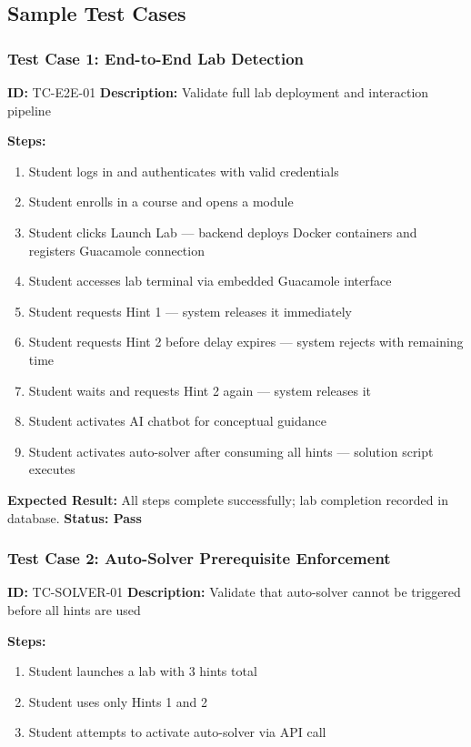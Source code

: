 \documentclass[12pt,a4paper]{report}
\begin{document}
\subsection{Sample Test Cases}

\subsubsection{Test Case 1: End-to-End Lab Detection}

\textbf{ID:} TC-E2E-01 \quad \textbf{Description:} Validate full lab deployment and interaction pipeline

\textbf{Steps:}
\begin{enumerate}
  \item Student logs in and authenticates with valid credentials
  \item Student enrolls in a course and opens a module
  \item Student clicks Launch Lab --- backend deploys Docker containers and registers Guacamole connection
  \item Student accesses lab terminal via embedded Guacamole interface
  \item Student requests Hint 1 --- system releases it immediately
  \item Student requests Hint 2 before delay expires --- system rejects with remaining time
  \item Student waits and requests Hint 2 again --- system releases it
  \item Student activates AI chatbot for conceptual guidance
  \item Student activates auto-solver after consuming all hints --- solution script executes
\end{enumerate}

\textbf{Expected Result:} All steps complete successfully; lab completion recorded in database.
\textbf{Status: Pass}

\subsubsection{Test Case 2: Auto-Solver Prerequisite Enforcement}

\textbf{ID:} TC-SOLVER-01 \quad \textbf{Description:} Validate that auto-solver cannot be triggered before all hints are used

\textbf{Steps:}
\begin{enumerate}
  \item Student launches a lab with 3 hints total
  \item Student uses only Hints 1 and 2
  \item Student attempts to activate auto-solver via API call
\end{enumerate}
\end{document}
